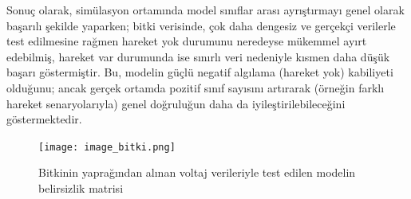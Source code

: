 Sonuç olarak, simülasyon ortamında model sınıflar arası ayrıştırmayı genel olarak başarılı şekilde yaparken; bitki verisinde, çok daha dengesiz ve gerçekçi verilerle test edilmesine rağmen hareket yok durumunu neredeyse mükemmel ayırt edebilmiş, hareket var durumunda ise sınırlı veri nedeniyle kısmen daha düşük başarı göstermiştir. Bu, modelin güçlü negatif algılama (hareket yok) kabiliyeti olduğunu; ancak gerçek ortamda pozitif sınıf sayısını artırarak (örneğin farklı hareket senaryolarıyla) genel doğruluğun daha da iyileştirilebileceğini göstermektedir.


\begin{figure}[H]
    \centering
    \texttt{[image: image\_bitki.png]}
    \caption{Bitkinin yaprağından alınan voltaj verileriyle test edilen modelin belirsizlik matrisi}
    \label{fig:bitki_cm}
\end{figure}


